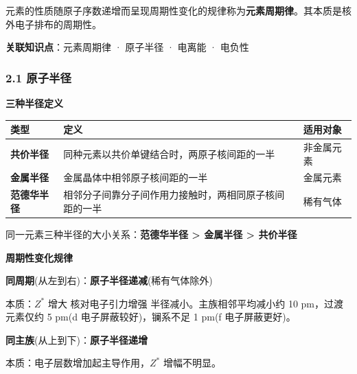 元素的性质随原子序数递增而呈现周期性变化的规律称为\textbf{元素周期律}。其本质是核外电子排布的周期性。

\textbf{关联知识点}：元素周期律 · 原子半径 · 电离能 · 电负性

\subsubsection{2.1 原子半径}\label{ux539fux5b50ux534aux5f84}

\textbf{三种半径定义}

{\def\LTcaptype{none} %
\begin{longtable}[]{@{}
  >{\raggedright\arraybackslash}p{}
  >{\raggedright\arraybackslash}p{}
  >{\raggedright\arraybackslash}p{}@{}}
\toprule\noalign{}
\begin{minipage}[b]{\linewidth}\raggedright
类型
\end{minipage} & \begin{minipage}[b]{\linewidth}\raggedright
定义
\end{minipage} & \begin{minipage}[b]{\linewidth}\raggedright
适用对象
\end{minipage} \\
\midrule\noalign{}
\endhead
\bottomrule\noalign{}
\endlastfoot
\textbf{共价半径} & 同种元素以共价单键结合时，两原子核间距的一半 & 非金属元素 \\
\textbf{金属半径} & 金属晶体中相邻原子核间距的一半 & 金属元素 \\
\textbf{范德华半径} & 相邻分子间靠分子间作用力接触时，两相同原子核间距的一半 & 稀有气体 \\
\end{longtable}
}

同一元素三种半径的大小关系：\textbf{范德华半径 \textgreater{} 金属半径 \textgreater{} 共价半径}

\textbf{周期性变化规律}

\textbf{同周期}(从左到右)：\textbf{原子半径递减}(稀有气体除外)

本质：\(Z^*\) 增大 \箭 核对电子引力增强 \箭 半径减小。主族相邻平均减小约 10 pm，过渡元素仅约 5 pm(d 电子屏蔽较好)，镧系不足 1 pm(f 电子屏蔽更好)。

\textbf{同主族}(从上到下)：\textbf{原子半径递增}

本质：电子层数增加起主导作用，\(Z^*\) 增幅不明显。

